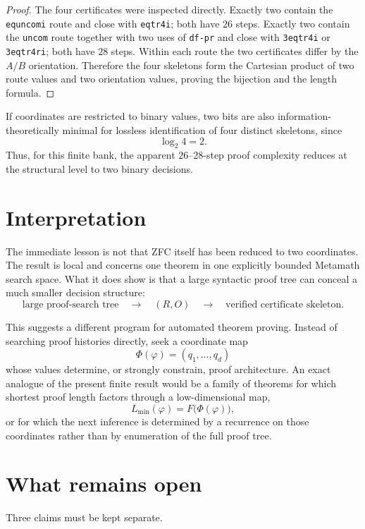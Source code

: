 \documentclass[11pt]{article}
\newcommand{\dfpr}{\texttt{df-pr}}
\newcommand{\uncom}{\texttt{uncom}}
\newcommand{\equncomi}{\texttt{equncomi}}
\newcommand{\eqtr}{\texttt{eqtr4i}}
\newcommand{\threeeq}{\texttt{3eqtr4i}}
\newcommand{\threeeqr}{\texttt{3eqtr4ri}}
\begin{document}
\begin{proof}
The four certificates were inspected directly. Exactly two contain the
\equncomi{} route and close with \eqtr{}; both have $26$ steps. Exactly two
contain the \uncom{} route together with two uses of \dfpr{} and close with
\threeeq{} or \threeeqr{}; both have $28$ steps. Within each route the two
certificates differ by the $A/B$ orientation. Therefore the four skeletons form
the Cartesian product of two route values and two orientation values, proving
the bijection and the length formula.
\end{proof}

If coordinates are restricted to binary values, two bits are also information-
theoretically minimal for lossless identification of four distinct skeletons,
since
\[
\log_2 4=2.
\]
Thus, for this finite bank, the apparent $26$--$28$-step proof complexity reduces
at the structural level to two binary decisions.

\section{Interpretation}

The immediate lesson is not that ZFC itself has been reduced to two coordinates.
The result is local and concerns one theorem in one explicitly bounded Metamath
search space. What it does show is that a large syntactic proof tree can conceal
a much smaller decision structure:
\[
\boxed{
\text{large proof-search tree}
\quad\longrightarrow\quad
(R,O)
\quad\longrightarrow\quad
\text{verified certificate skeleton}.
}
\]

This suggests a different program for automated theorem proving. Instead of
searching proof histories directly, seek a coordinate map
\[
\Phi(\varphi)=(q_1,\dots,q_d)
\]
whose values determine, or strongly constrain, proof architecture. An exact
analogue of the present finite result would be a family of theorems for which
shortest proof length factors through a low-dimensional map,
\[
L_{\min}(\varphi)=F\bigl(\Phi(\varphi)\bigr),
\]
or for which the next inference is determined by a recurrence on those
coordinates rather than by enumeration of the full proof tree.

\section{What remains open}

Three claims must be kept separate.
\end{document}
